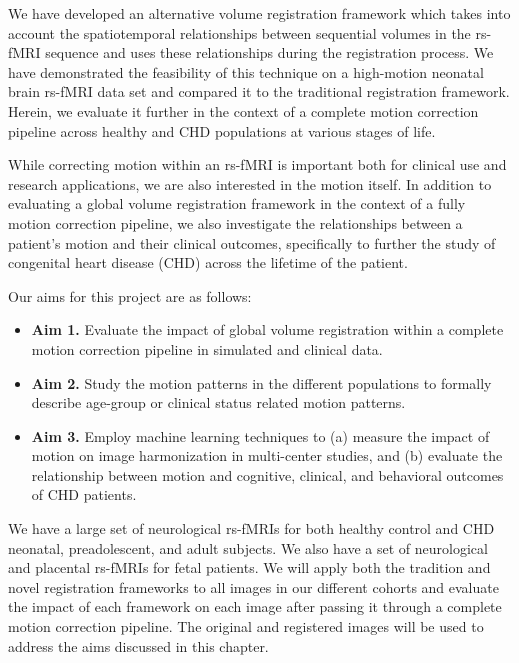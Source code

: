 We have developed an alternative volume registration framework which takes into account the spatiotemporal relationships between sequential volumes in the rs-fMRI sequence and uses these relationships during the registration process. We have demonstrated the feasibility of this technique on a high-motion neonatal brain rs-fMRI data set and compared it to the traditional registration framework. Herein, we evaluate it further in the context of a complete motion correction pipeline across healthy and CHD populations at various stages of life. 

While correcting motion within an rs-fMRI is important both for clinical use and research applications, we are also interested in the motion itself. In addition to evaluating a global volume registration framework in the context of a fully motion correction pipeline, we also investigate the relationships between a patient's motion and their clinical outcomes, specifically to further the study of congenital heart disease (CHD) across the lifetime of the patient. %


Our aims for this project are as follows:
\begin{itemize}
\item \textbf{Aim 1.} Evaluate the impact of global volume registration within a complete motion correction pipeline in simulated and clinical data.
\item \textbf{Aim 2.} Study the motion patterns in the different populations to formally describe age-group or clinical status related motion patterns.
\item \textbf{Aim 3.} Employ machine learning techniques to (a) measure the impact of motion on image harmonization in multi-center studies, and (b) evaluate the relationship between motion and cognitive, clinical, and behavioral outcomes of CHD patients.
\end{itemize}


We have a large set of neurological rs-fMRIs for both healthy control and CHD neonatal, preadolescent, and adult subjects. We also have a set of neurological and placental rs-fMRIs for fetal patients. We will apply both the tradition and novel registration frameworks to all images in our different cohorts and evaluate the impact of each framework on each image after passing it through a complete motion correction pipeline. The original and registered images will be used to address the aims discussed in this chapter.

